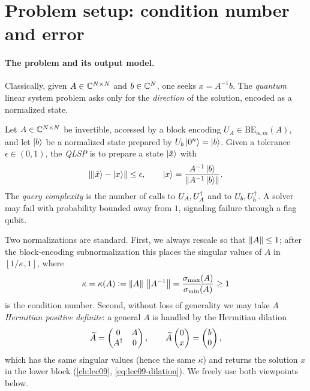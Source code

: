 \section{Problem setup: condition number and error}
\label{sec:lec10-1}

\paragraph{The problem and its output model.}
Classically, given $A\in\mathbb{C}^{N\times N}$ and $b\in\mathbb{C}^N$, one seeks $x=A^{-1}b$. The
\emph{quantum} linear system problem asks only for the \emph{direction} of the
solution, encoded as a normalized state.

\begin{definition}
\label{def:lec10-qlsp}
Let $A\in\mathbb{C}^{N\times N}$ be invertible, accessed by a block encoding
$U_A\in\mathrm{BE}_{\alpha,m}(A)$, and let $\ket b$ be a normalized state prepared by
$U_b\ket{0^n}=\ket b$. Given a tolerance $\epsilon\in(0,1)$, the \emph{QLSP} is to
prepare a state $\ket{\tilde x}$ with
\begin{equation}
  \left\lVert \ket{\tilde x}-\ket x \right\rVert\le\epsilon,\qquad
  \ket x=\frac{A^{-1}\ket b}{\left\lVert A^{-1}\ket b \right\rVert}.
  \label{eq:lec10-qlsp}
\end{equation}
The \emph{query complexity} is the number of calls to $U_A,U_A^{\dagger}$ and to $U_b,U_b^{\dagger}$.
A solver may fail with probability bounded away from $1$, signaling failure through a
flag qubit.
\end{definition}

Two normalizations are standard. First, we always rescale so that $\left\lVert A \right\rVert\le1$; after
the block-encoding subnormalization this places the singular values of $A$ in
$[1/\kappa,1]$, where
\begin{equation}
  \kappa=\kappa(A)\vcentcolon=\left\lVert A \right\rVert\,\left\lVert A^{-1} \right\rVert
        =\frac{\sigma_{\max}(A)}{\sigma_{\min}(A)}\ge1
  \label{eq:lec10-kappa}
\end{equation}
is the condition number. Second, without loss of generality we may take $A$
\emph{Hermitian positive definite}: a general $A$ is handled by the Hermitian dilation
\begin{equation}
  \widetilde A=\begin{pmatrix}0&A\\ A^{\dagger}&0\end{pmatrix},\qquad
  \widetilde A\begin{pmatrix}0\\ x\end{pmatrix}=\begin{pmatrix}b\\ 0\end{pmatrix},
  \label{eq:lec10-dilation}
\end{equation}
which has the same singular values (hence the same $\kappa$) and returns the solution
$x$ in the lower block (\cref{ch:lec09}, \eqref{eq:lec09-dilation}). We freely use both
viewpoints below.

